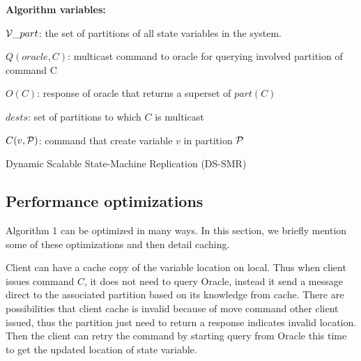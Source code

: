\begin{algorithm}
\begin{distribalgo}[1]
\vspace{1.5mm}

\textbf{Algorithm variables:}

\vspace{1mm}

$\mathcal{V}\_part$: the set of partitions of all state variables in the system.

\vspace{1mm}

$Q(oracle, C)$: multicast command to oracle for querying involved partition of command C

\vspace{1mm}

$O(C)$: response of oracle that returns a superset of $part(C)$

\vspace{1mm}

$dests$: set of partitions to which $C$ is multicast

\vspace{1mm}

$C(v, \mathcal{P})$: command that create variable $v$ in partition $\mathcal{P}$

\caption{Dynamic Scalable State-Machine Replication (DS-SMR)}
\label{alg:dynssmr}
\end{distribalgo}
\end{algorithm}

\subsection{Performance optimizations}
\label{sec:optm}

Algorithm 1 can be optimized in many ways. In this section, we briefly mention some of these optimizations and then detail caching.

Client can have a cache copy of the variable location on local. Thus when client issues command $C$, it does not need to query Oracle, instead it send a message direct to the associated partition based on its knowledge from cache. There are possibilities that client cache is invalid because of move command other client issued, thus the partition just need to return a response indicates invalid location. Then the client can retry the command by starting query from Oracle this time to get the updated location of state variable. 

